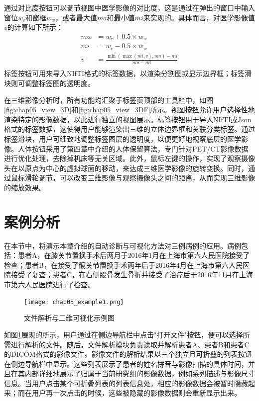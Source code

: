 通过对比度按钮可以调节视图中医学影像的对比度，这是通过在弹出的窗口中输入窗位\(w_c\)和窗框\(w_w\)，或者最大值\(ma\)和最小值\(mi\)来实现的。具体而言，对医学影像值\(v\)的计算如下所示：
\begin{equation}
    \begin{aligned}
        ma & = w_c + 0.5 \times w_w                       \\
        mi & = w_c - 0.5 \times w_w                       \\
        v  & = \frac{\min(\max(mi, v), ma) - mi}{ma - mi} \\
    \end{aligned}
    \label{eq:chap05_constrast}
\end{equation}
标签按钮可用来导入NIfTI格式的标签数据，以渲染分割图或显示边界框；标签滑块则可调整标签图的透明度。

在三维影像分析时，所有功能均汇聚于标签页顶部的工具栏中，如图\ref{fig:chap05_view_3D}和\ref{fig:chap05_view_3DF}所示。视图按钮允许用户选择性地渲染特定的影像数据，以此进行独立的视图展示。标签按钮用于导入NIfTI或Json格式的标签数据，这使得用户能够渲染出三维的立体边界框和关联分类标签。通过标签滑块，用户可细致地调整标签图层的透明度，以便更好地视察底层的医学影像。人体按钮采用了第四章中介绍的人体保留算法，专门针对PET/CT影像数据进行优化处理，去除掉机床等无关区域。此外，鼠标左键的操作，实现了观察摄像头在以原点为中心的虚拟球面的移动，来达成三维医学影像的旋转变换。同时，通过鼠标滑轮调节，可以改变三维影像与观察摄像头之间的距离，从而实现三维影像的缩放效果。

\section{案例分析}

在本节中，将演示本章介绍的自动诊断与可视化方法对三例病例的应用。病例包括：患者A，在膝关节置换手术后两月于2016年1月在上海市第六人民医院接受了检查；患者B，在接受了髋关节置换手术两年后于2016年4月在上海市第六人民医院接受了复查；患者C，在右侧股骨发生骨折并接受了治疗后于2016年11月在上海市第六人民医院进行了检查。

\begin{figure}[htbp]
    \centering
    \texttt{[image: chap05\_example1.png]}
    \caption{文件解析与二维可视化示例图}
    \label{fig:chap05_example1}
\end{figure}

如图\ref{fig:chap05_example1}展现的所示，用户通过在侧边导航栏中点击"打开文件"按钮，便可以选择所需进行解析的文件。随后，文件解析模块负责读取并解析患者A、患者B和患者C的DICOM格式的影像文件。影像文件的解析结果以三个独立且可折叠的列表按钮在侧边导航栏中显示。这些列表展示了患者的姓名拼音与影像扫描的具体时间，并且在其内部详细地展示了归属于当前研究组的影像数据，例如系列描述与影像尺寸信息。当用户点击某个可折叠列表的列表信息处，相应的影像数据会被暂时隐藏起来；而在用户再一次点击的时候，这些被隐藏的影像数据则会重新显示出来。

